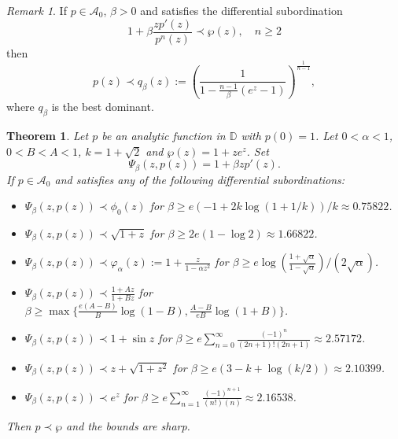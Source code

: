 \documentclass[12pt, reqno]{amsart}
\numberwithin{equation}{section}
\theoremstyle{plain}
\newtheorem{theorem}{Theorem}[section]
\theoremstyle{definition}
\theoremstyle{remark}
\newtheorem{remark}{Remark}[section]
\begin{document}
\begin{remark}
	If $p\in \mathcal{A}_{0}$, $\beta>0$ and satisfies the differential subordination
	$$1+\beta\frac{zp'(z)}{p^{n}(z)}\prec\wp(z),\quad n\geq2$$
	then 
	$$p(z)\prec q_{\beta}(z):=\left(\frac{1}{1-\frac{n-1}{\beta}(e^z-1)}\right)^{\frac{1}{n-1}},$$
	where $q_{\beta}$ is the best dominant.
\end{remark}


\begin{theorem}\label{sb1}
	Let $p$ be an analytic function in $\mathbb{D}$ with $p(0)=1$. Let $0<\alpha<1$, $0<B<A<1$, $k=1+\sqrt{2}$ and $\wp(z)=1+ze^z$. Set
	\begin{equation*}
	\Psi_\beta(z, p(z))=1+\beta zp'(z). 
	\end{equation*}  
	If $p\in \mathcal{A}_{0}$ and  satisfies any of the following differential subordinations:
	\begin{itemize}
		\item [$(i)$] $\Psi_\beta(z, p(z)) \prec \phi_0(z)$ for $\beta\geq e(-1+2k\log(1+1/k))/k \approx0.75822$.
		\item [$(ii)$] $\Psi_\beta(z, p(z)) \prec \sqrt{1+z}$ for $\beta \geq 2e(1-\log{2})\approx 1.66822$.
		\item [$(iii)$] $\Psi_\beta(z, p(z)) \prec \varphi_\alpha(z):=1+\tfrac{z}{1-\alpha z^2}$ for $\beta\geq e\log(\frac{1+\sqrt{\alpha}}{1-\sqrt{\alpha}})/(2\sqrt{\alpha})$.
		\item [$(iv)$] $\Psi_\beta(z, p(z)) \prec \tfrac{1+Az}{1+Bz}$ for $\beta \geq \max\{\frac{e(A-B)}{B}\log(1-B), \frac{A-B}{eB}\log(1+B)\}$.
		\item [$(v)$] $\Psi_\beta(z, p(z)) \prec 1+\sin{z}$ for $\beta \geq e\sum_{n=0}^{\infty}\frac{(-1)^n}{(2n+1)!(2n+1)}\approx2.57172$.
		\item [$(vi)$] $\Psi_\beta(z, p(z)) \prec z+\sqrt{1+z^2}$ for $\beta\geq e(3-k+\log{(k/2)})\approx2.10399$.
		\item [$(vii)$] $\Psi_\beta(z, p(z)) \prec e^z$ for $\beta\geq e\sum_{n=1}^{\infty}\frac{(-1)^{n+1}}{(n!)(n)}\approx2.16538$.
	\end{itemize}
	Then $p \prec \wp$ and the bounds are sharp.
\end{theorem}
\end{document}
